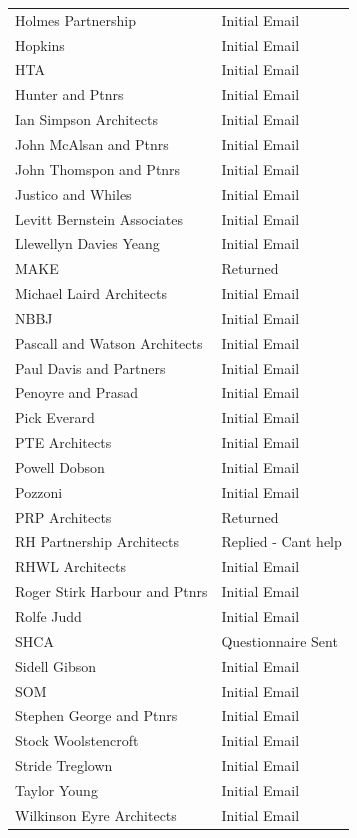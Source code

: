 \documentclass[table,a4paper,oneside]{book}
\begin{document}
\begin{longtable}{ll}
Holmes Partnership & Initial Email \\
Hopkins & Initial Email \\
HTA & Initial Email \\
Hunter and Ptnrs & Initial Email \\
Ian Simpson Architects & Initial Email \\
John McAlsan and Ptnrs & Initial Email \\
John Thomspon and Ptnrs & Initial Email \\
Justico and Whiles & Initial Email \\
Levitt Bernstein Associates & Initial Email \\
Llewellyn Davies Yeang & Initial Email \\
MAKE & Returned \\
Michael Laird Architects & Initial Email \\
NBBJ & Initial Email \\
Pascall and Watson Architects & Initial Email \\
Paul Davis and Partners & Initial Email \\
Penoyre and Prasad & Initial Email \\
Pick Everard & Initial Email \\
PTE Architects & Initial Email \\
Powell Dobson & Initial Email \\
Pozzoni & Initial Email \\
PRP Architects & Returned \\
RH Partnership Architects & Replied - Cant help \\
RHWL Architects & Initial Email \\
Roger Stirk Harbour and Ptnrs & Initial Email \\
Rolfe Judd & Initial Email \\
SHCA & Questionnaire Sent \\
Sidell Gibson & Initial Email \\
SOM & Initial Email \\
Stephen George and Ptnrs & Initial Email \\
Stock Woolstencroft & Initial Email \\
Stride Treglown & Initial Email \\
Taylor Young & Initial Email \\
Wilkinson Eyre Architects & Initial Email \\

\end{longtable}
\end{document}
